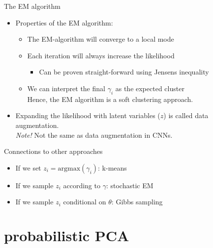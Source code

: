 \documentclass[10pt]{beamer}
\begin{document}
\begin{frame}{The EM algorithm}

\begin{itemize}
\item Properties of the EM algorithm:
\begin{itemize}
\item The EM-algorithm will converge to a {\color{uured} local mode}\pause
\item Each iteration will {\color{uured} always} increase the likelihood
\begin{itemize}
\item Can be proven straight-forward using Jensens inequality%
\end{itemize}
\pause
\item We can interpret the final $\gamma_i$ as the {\color{uured} expected cluster}\\
Hence, the EM algorithm is a {\color{uured} soft clustering} approach.
\end{itemize}
\item Expanding the likelihood with latent variables ($z$) is called {\color{uured} data augmentation}.
\\ \emph{Note!} Not the same as data augmentation in CNNs.
\end{itemize}

\end{frame}


\begin{frame}{Connections to other approaches}

\begin{itemize}
\item If we set $z_i = \text{argmax}(\gamma_i)$: {\color{uured} k-means}\pause
\item If we sample $z_i$ according to $\gamma$: {\color{uured} stochastic EM}\pause
\item If we sample $z_i$ conditional on $\theta$: {\color{uured} Gibbs sampling}

\end{itemize}

\end{frame}

\section{probabilistic PCA}
\frame{\sectionpage}
\end{document}
